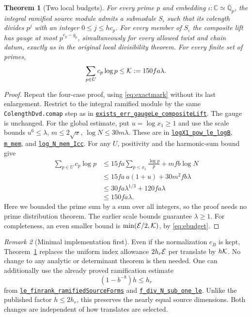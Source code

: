 \documentclass[11pt,letterpaper]{article}
\newtheorem{theorem}{Theorem}[section]
\theoremstyle{remark}\newtheorem{remark}[theorem]{Remark}
\newcommand{\src}[3]{\href{https://github.com/VladimirReshetnikov/ProveIt/blob/89d12dd40424f1217fd818d84877b3da52396a3b/Analysis/GeneralizedRiemannHypothesis/Lean/grh/src/#1.lean\#L#2}{\texttt{#3}}}
\begin{document}
\begin{theorem}[Two local budgets]\label{thm:two}
For every prime $p$ and embedding $\iota:\mathbb C\simeq\overline{\mathbb Q}_p$, the integral ramified source module admits a submodule $S_\iota$ such that its colength divides $p^j$ with an integer $0\le j\le h c_p$. For every member of $S_\iota$ the composite lift has gauge at most $p^{e_p-g_p}$, simultaneously for every allowed twist and chain datum, exactly as in the original local divisibility theorem. For every finite set of primes,
\begin{equation}\label{eq:kbound}
 \sum_{p\in U}c_p\log p\le\mathcal K:=150fa\lambda.
\end{equation}
\end{theorem}
\begin{proof}
Repeat the four-case proof, using \eqref{eq:exactmark} without its last enlargement. Restrict to the integral ramified module by the same \texttt{ColengthDvd.comap} step as in \src{New/UpperBound/Divisibility/LocalDivisibility}{494}{exists\_err\_gaugeLe\_compositeLift}. The gauge is unchanged. For the global estimate, put $u=\log x_1\ge1$ and use the scale bounds $u^6\le\lambda$, $m\le2\sqrt x$, $\log N\le30m\lambda$. These are in \src{New/Reduction/Data/Sizes}{58}{logX1\_pow\_le\_logB}, \src{New/Reduction/Data/AdmissibleData}{114}{m\_mem}, and \src{New/Reduction/Data/LevelAndTwists}{234}{log\_N\_mem\_Icc}. For any $U$, positivity and the harmonic-sum bound give
\begin{align*}
 \sum_{p\in U}c_p\log p
 &\le 15fa\sum_{p<x_1}\frac{\log p}{p}+mfb\log N\\
 &\le 15fa\,u(1+u)+30m^2fb\lambda\\
 &\le 30fa\lambda^{1/3}+120fa\lambda\\
 &\le 150fa\lambda.
\end{align*}
Here we bounded the prime sum by a sum over all integers, so the proof needs no prime distribution theorem. The earlier scale bounds guarantee $\lambda\ge1$. For completeness, an even smaller bound is $\min(\mathcal E/2,\mathcal K)$, by \eqref{eq:ebudget}.
\end{proof}

\begin{remark}[Minimal implementation first]
Even if the normalization $c_B$ is kept, Theorem~\ref{thm:two} replaces the uniform index allowance $2h_r\mathcal E$ per translate by $h\mathcal K$. No change to any analytic or determinant theorem is then needed. One can additionally use the already proved ramification estimate
\begin{equation}\label{eq:ram}
 (1-b^{-8})h\le h_r
\end{equation}
from \src{New/UpperBound/Size/ShortColumns}{944}{le\_finrank\_ramifiedSourceForms} and \src{New/UpperBound/Size/ShortColumns}{955}{f\_div\_N\_sub\_one\_le}. Unlike the published factor $h\le2h_r$, this preserves the nearly equal source dimensions. Both changes are independent of how translates are selected.
\end{remark}
\end{document}

